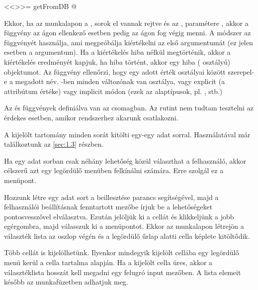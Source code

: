\begin{description}
\begin{description}
\begin{Rnw}
<<>>=
getFromDB
@      
    \end{Rnw}
    Ekkor, ha az  munkalapon a ,  sorok
    el vannak rejtve és az ,  paramétere
    , akkor a 
    függvény az  ágon ellenkező esetben pedig az
     ágon fog 
    végig menni. A módszer az   függvényét használja, ami
    megpróbálja kiértékelni az első argumentumát (ez jelen esetben a
     argumentum). Ha a kiértékelés hiba nélkül megtörténik, akkor
    a kiértékelés eredményét kapjuk, ha hiba történt, akkor egy hiba
    ( osztályú) objektumot.  Az 
    függvény ellenőrzi, 
    hogy egy adott érték osztályai között szerepel-e  a megadott
    név. -ben minden változónak van osztálya, vagy explicit (a
    attribútum értéke) vagy implicit módon (ezek az alaptípusok,
    pl. , stb.) 

    Az  és  függvények
    definiálva van az  csomagban. Az  rutint
    nem tudtam  tesztelni az érdekes esetben, amikor 
    rendszerhez akarunk 
    csatlakozni.  
\item[\code{Data Line}] A kijelölt tartomány minden sorát kitölti
    egy-egy adat sorral. Használatával már találkoztunk az \ref{sec:1.3}
    részben.  
  \item[\code{Drop down data}] Ha egy adat sorban csak néhány lehetőség
    közül választhat a felhasználó, akkor célszerű azt egy legördülő
    menüben felkínálni számára. Erre szolgál ez a menüpont.
    
    Hozzunk létre egy adat sort a  beillesztése parancs
    segítségével, majd a felhasználói beállításnak fenntartott mezőbe
    írjuk be a lehetőségeket pontosvesszővel
    elválasztva. Ezután jelöljük ki a cellát és klikkeljünk a jobb
    egérgombra, majd válasszuk ki a  menüpontot. Ekkor
    az  munkalapon létrejön a választék lista az
     oszlop 
    végén és a legördülő űrlap alatti cella képlete kitöltődik.

    Több cellát is kijelölhetünk. Ilyenkor mindegyik kijelölt cellába
    egy legördülő menü kerül a cella tartalma alapján.  Ha a
    kijelölt cella üres, akkor a választéklista hosszát kell megadni
    egy felugró input mezőben. A lista elemeit később az 
    munkafüzetben adhatjuk meg.


\end{description}
\end{description}
